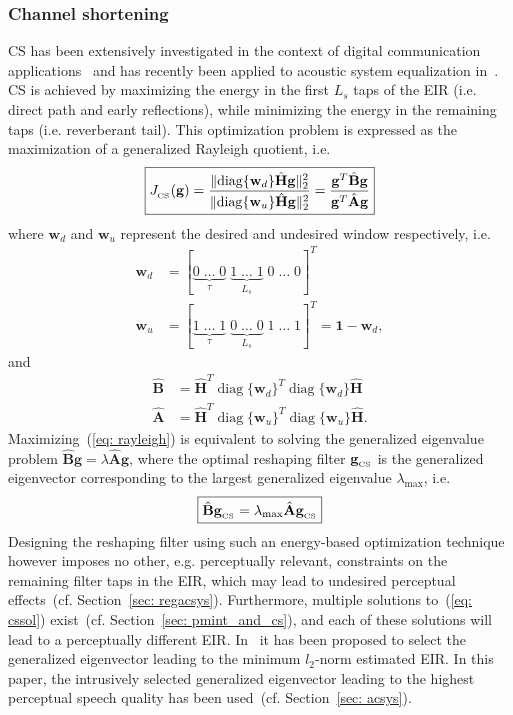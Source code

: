 \documentclass[10pt]{IEEEtran}
\DeclareMathOperator{\diag}{diag}
\begin{document}
\subsubsection*{Channel shortening~\cite{Kallinger_ICASSP_2006}}
CS has been extensively investigated in the context of digital communication applications~\cite{Martin_ITSP_2005} and has recently been applied to acoustic system equalization in~\cite{Kallinger_ICASSP_2006, Zhang_IWAENC_2010}.
CS is achieved by maximizing the energy in the first $L_s$ taps of the EIR (i.e. direct path and early reflections), while minimizing the energy in the remaining taps (i.e. reverberant tail).
This optimization problem is expressed as the maximization of a generalized Rayleigh quotient, i.e.
\begin{equation}
\label{eq: rayleigh}
\boxed{J_{_{\rm CS}} (\mathbf{g}) =  \frac{\|{\diag}\{\mathbf{w}_d\}\hat{\mathbf{H}}\mathbf{g}\|_2^2}{\|{\diag}\{\mathbf{w}_u\}\hat{\mathbf{H}}\mathbf{g}\|_2^2} = \frac{\mathbf{g}^T \hat{\mathbf{B}} \mathbf{g}}{\mathbf{g}^T \hat{\mathbf{A}} \mathbf{g}}}
\end{equation}
where $\mathbf{w}_d$ and $\mathbf{w}_u$ represent the desired and undesired window respectively, i.e.
\begin{align}
\label{eq: wincs}
\mathbf{w}_d & = [\underbrace{0 \; \ldots \; 0}_{\tau} \; \underbrace{1 \; \ldots \; 1}_{L_s}\; 0\; \ldots\; 0]^{T}  \\
\mathbf{w}_u & = [\underbrace{1 \; \ldots \; 1}_{\tau} \; \underbrace{0 \; \ldots \; 0}_{L_s}\; 1\; \ldots\; 1]^{T} = \mathbf{1} - \mathbf{w}_d,
\end{align}
and
\begin{align}
\hat{\mathbf{B}} & = \hat{\mathbf{H}}^{T} {\diag}\{\mathbf{w}_d \}^T{\diag}\{\mathbf{w}_d \}\hat{\mathbf{H}}  \\
\hat{\mathbf{A}} & = \hat{\mathbf{H}}^{T} {\diag}\{\mathbf{w}_u \}^T{\diag}\{\mathbf{w}_u \}\hat{\mathbf{H}}.
\end{align}
Maximizing~(\ref{eq: rayleigh}) is equivalent to solving the generalized eigenvalue problem $\hat{\mathbf{B}} \mathbf{g} = \lambda \hat{\mathbf{A}} \mathbf{g}$, where the optimal reshaping filter $\mathbf{g}_{_{\rm CS}}$ is the generalized eigenvector corresponding to the largest generalized eigenvalue $\lambda_{\max}$, i.e.
\begin{equation}
\label{eq: cssol}
\boxed{\hat{\mathbf{B}} \mathbf{g}_{_{\rm CS}} = \lambda_{\max} \hat{\mathbf{A}}\mathbf{g}_{_{\rm CS}}}
\end{equation}
Designing the reshaping filter using such an energy-based optimization technique however imposes no other, e.g. perceptually relevant, constraints on the remaining filter taps in the EIR, which may lead to undesired perceptual effects~(cf. Section~\ref{sec: regacsys}).
Furthermore, multiple solutions to~(\ref{eq: cssol}) exist~(cf. Section~\ref{sec: pmint_and_cs}), and each of these solutions will lead to a perceptually different EIR.
In~\cite{Zhang_IWAENC_2010} it has been proposed to select the generalized eigenvector leading to the minimum $l_2$-norm estimated EIR.
In this paper, the intrusively selected generalized eigenvector leading to the highest perceptual speech quality has been used~(cf. Section~\ref{sec: acsys}).
\end{document}
